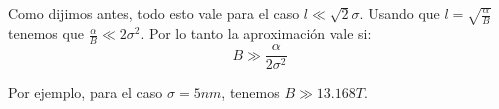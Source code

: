 \documentclass[a4paper,10pt]{article}
\begin{document}
Como dijimos antes, todo esto vale para el caso $l\ll \sqrt{2}\sigma$. Usando que
$l = \sqrt{\frac{\alpha}{B}}$ tenemos que $\frac{\alpha}{B}\ll 2\sigma^2$.
Por lo tanto la aproximaci\'on vale si:
\begin{equation}
\label{condicion}
B\gg\frac{\alpha}{2\sigma^2}
\end{equation}

Por ejemplo, para el caso $\sigma = 5nm$, tenemos $B\gg 13.168 T$.


{}


%
%
%
%
%
\end{document}
